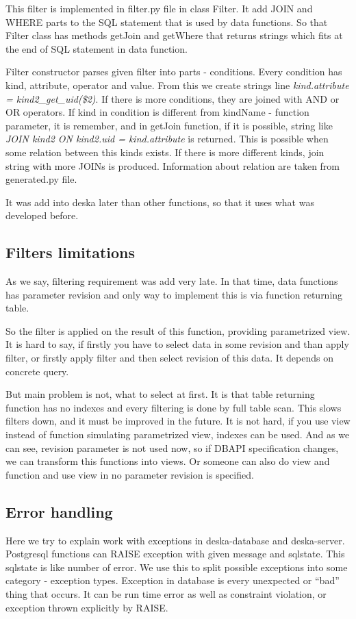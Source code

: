\documentclass[deska]{subfiles}
\begin{document}
This filter is implemented in filter.py file in class Filter.
It add JOIN and WHERE parts to the SQL statement that is used by data functions. So that Filter class has
methods getJoin and getWhere that returns strings which fits at the end of SQL statement in data function.

Filter constructor parses given filter into parts - conditions.
Every condition has kind, attribute, operator and value. From this we create strings line
{\em kind.attribute = kind2\_get\_uid(\$2)}. If there is more conditions, they are joined with AND or OR
operators.
If kind in condition is different from kindName - function parameter, it is remember,
and in getJoin function, if it is possible, string like {\em JOIN kind2 ON kind2.uid = kind.attribute}
is returned. This is possible when some relation between this kinds exists.
If there is more different kinds, join string with more JOINs is produced.
Information about relation are taken from generated.py file.

It was add into deska later than other functions, so that it uses what was developed before.

\subsection{Filters limitations}
\label{sec:filter-speed}
As we say, filtering requirement was add very late. In that time, data functions has parameter revision
and only way to implement this is via function returning table.

So the filter is applied on the result of this function, providing parametrized view.
It is hard to say, if firstly you have to select data in some revision and than apply filter,
or firstly apply filter and then select revision of this data. It depends on concrete query.

But main problem is not, what to select at first. It is that table returning function has
no indexes and every filtering is done by full table scan.
This slows filters down, and it must be improved in the future. It is not hard,
if you use view instead of function simulating parametrized view, indexes can be used.
And as we can see, revision parameter is not used now, so if DBAPI specification changes,
we can transform this functions into views. Or someone can also do view and function
and use view in no parameter revision is specified.

\subsection{Error handling}
Here we try to explain work with exceptions in deska-database and deska-server. Postgresql functions can RAISE exception with given message and sqlstate.
This sqlstate is like number of error. We use this to split possible exceptions into some category - exception types. Exception in database is
every unexpected or “bad” thing that occurs. It can be run time error as well as constraint violation, or exception thrown explicitly by RAISE.
\end{document}
